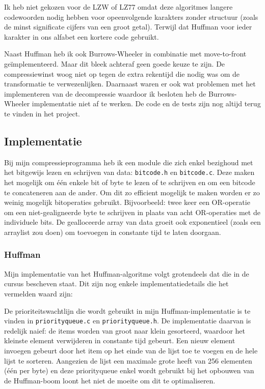 \documentclass[a4paper]{article}
\begin{document}
Ik heb niet gekozen voor de LZW of LZ77 omdat deze algoritmes langere codewoorden nodig hebben voor opeenvolgende karakters zonder structuur (zoals de minst significate cijfers van een groot getal). Terwijl dat Huffman voor ieder karakter in ons alfabet een kortere code gebruikt.

Naast Huffman heb ik ook Burrows-Wheeler in combinatie met move-to-front geïmplementeerd. Maar dit bleek achteraf geen goede keuze te zijn. De compressiewinst woog niet op tegen de extra rekentijd die nodig was om de transformatie te verwezenlijken. Daarnaast waren er ook wat problemen met het implementeren van de decompressie waardoor ik besloten heb de Burrows-Wheeler implementatie niet af te werken. De code en de tests zijn nog altijd terug te vinden in het project.

\subsection{Implementatie}
Bij mijn compressieprogramma heb ik een module die zich enkel bezighoud met het bitgewijs lezen en schrijven van data: \texttt{bitcode.h} en \texttt{bitcode.c}. Deze maken het mogelijk om één enkele bit of byte te lezen of te schrijven en om een bitcode te concateneren aan de ander. Om dit zo efficient mogelijk te maken worden er zo weinig mogelijk bitoperaties gebruikt. Bijvoorbeeld: twee keer een OR-operatie om een niet-gealigneerde byte te schrijven in plaats van acht OR-operaties met de individuele bits. De gealloceerde array van data groeit ook exponentieel (zoals een arraylist zou doen) om toevoegen in constante tijd te laten doorgaan.

\subsubsection{Huffman}

Mijn implementatie van het Huffman-algoritme volgt grotendeels dat die in de cursus bescheven staat. Dit zijn nog enkele implementatiedetails die het vermelden waard zijn:

De prioriteitswachtlijn die wordt gebruikt in mijn Huffman-implementatie is te vinden in \texttt{priorityqueue.c} en \texttt{priorityqueue.h}. De implementatie daarvan is redelijk naief: de items worden van groot naar klein gesorteerd, waardoor het kleinste element verwijderen in constante tijd gebeurt. Een nieuw element invoegen gebeurt door het item op het einde van de lijst toe te voegen en de hele lijst te sorteren. Aangezien de lijst een maximale grote heeft van 256 elementen (één per byte) en deze priorityqueue enkel wordt gebruikt bij het opbouwen van de Huffman-boom loont het niet de moeite om dit te optimaliseren.
\end{document}
